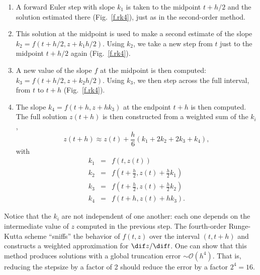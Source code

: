 \begin{enumerate}
\item
A forward Euler step with slope $k_{1}$ is taken to the midpoint $t+h/2$ and the solution estimated there (Fig.~\ref{f.rk4}), just as in the second-order method.

\item
This solution at the midpoint is used to make a second estimate of the slope $k_{2} = f(t+h/2,z+k_{1}h/2)$. Using $k_{2}$, we take a new step from $t$ just to the midpoint $t+h/2$ again (Fig.~\ref{f.rk4}).

\item
A new value of the slope $f$ at the midpoint is then computed: $k_{3}=f(t+h/2,z+k_{2}h/2)$. Using $k_{3}$, we then step across the full interval, from $t$ to $t+h$ (Fig.~\ref{f.rk4}).

\item
The slope $k_{4} = f(t+h,z+hk_{3})$ at the endpoint $t+h$ is then computed. The full solution $z(t+h)$ is then constructed from a weighted sum of the $k_{i}$,
\begin{equation}\label{e.rk4}
	z(t+h) \approx z(t) + \frac{h}{6}\left(k_{1} + 2k_{2} + 2k_{3} + k_{4}\right),
\end{equation}
with
\begin{eqnarray*}
k_{1} &=& f(t,z(t)) \\
k_{2} &=& f\left(t+\frac{h}{2}, z(t) + \frac{h}{2}k_{1}\right)\\
k_{3} &=& f\left(t+\frac{h}{2},z(t) + \frac{h}{2}k_{2}\right)\\
k_{4} &=& f\left(t + h, z(t) + hk_{3}\right).
\end{eqnarray*}
\end{enumerate}

Notice that the $k_{i}$ are not independent of one another: each one depends on the intermediate value of $z$ computed in the previous step. The fourth-order Runge-Kutta scheme ``sniffs'' the behavior of $f(t,z)$ over the interval $(t,t+h)$ and constructs a weighted approximation for $\dif z/\dif t$.  One can show that this method produces solutions with a global truncation error $\sim\mathcal{O}(h^{4})$. That is, reducing the stepsize by a factor of 2 should reduce the error by a factor $2^{4} = 16$.

